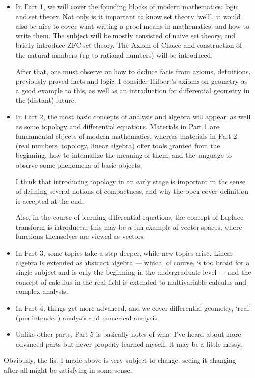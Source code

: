 \begin{itemize}
    \item In Part 1,
    we will cover the founding blocks of modern mathematics;
    logic and set theory.
    Not only is it important to know set theory `well',
    it would also be nice to cover
    what writing a proof means in mathematics,
    and how to write them.
    The subject will be mostly consisted of naive set theory,
    and briefly introduce ZFC set theory.
    The Axiom of Choice
    and construction of the natural numbers (up to rational numbers)
    will be introduced.

    After that,
    one must observe on how to deduce facts
    from axioms, definitions, previously proved facts and logic.
    I consider Hilbert's axioms on geometry
    as a good example to this,
    as well as an introduction for differential geometry
    in the (distant) future.

    \item In Part 2,
    the most basic concepts of analysis and algebra will appear;
    as well as some topology and differential equations.
    Materials in Part 1 are fundamental objects of modern mathematics,
    whereas materials in Part 2
    (real numbers, topology, linear algebra)
    offer
    tools granted from the beginning,
    how to internalize the meaning of them,
    and the language to observe some phenomena of basic objects.

    I think that introducing topology in an early stage is important
    in the sense of defining several notions of compactness,
    and why the open-cover definition is accepted at the end.

    Also, in the course of learning differential equations,
    the concept of Laplace transform is introduced;
    this may be a fun example of vector spaces,
    where functions themselves are viewed as vectors.

    \item In Part 3,
    some topics take a step deeper, while new topics arise.
    Linear algebra is extended as abstract algebra
    ---
    which, of course, is too broad for a single subject
    and is only the beginning in the undergraduate level
    ---
    and the concept of calculus in the real field
    is extended to multivariable calculus and complex analysis.

    \item In Part 4,
    things get more advanced,
    and we cover differential geometry,
    `real' (pun intended) analysis
    and numerical analysis.

    \item Unlike other parts,
    Part 5 is basically notes of what I've heard about
    more advanced parts but never properly learned myself.
    It may be a little messy.
\end{itemize}

Obviously,
the list I made above is very subject to change;
seeing it changing after all might be satisfying in some sense.